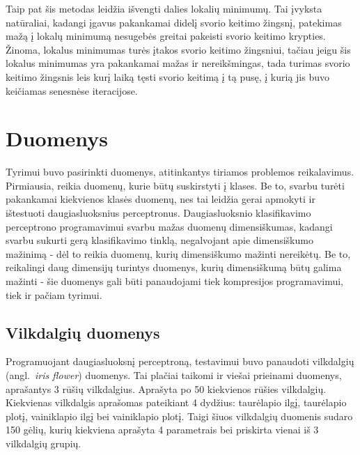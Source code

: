 \documentclass{VUMIFPSbakalaurinis}
\begin{document}
Taip pat šis metodas leidžia išvengti dalies lokalių minimumų.
Tai įvyksta natūraliai, kadangi įgavus pakankamai didelį svorio keitimo žingsnį, patekimas mažą į lokalų minimumą nesugebės greitai pakeisti svorio keitimo krypties.
Žinoma, lokalus minimumas turės įtakos svorio keitimo žingsniui, tačiau jeigu šis lokalus minimumas yra pakankamai mažas ir nereikšmingas, tada turimas svorio keitimo žingsnis leis kurį laiką tęsti svorio keitimą į tą pusę, į kurią jis buvo keičiamas senesnėse iteracijose.




\section{Duomenys}

Tyrimui buvo pasirinkti duomenys, atitinkantys tiriamos problemos reikalavimus.
Pirmiausia, reikia duomenų, kurie būtų suskirstyti į klases.
Be to, svarbu turėti pakankamai kiekvienos klasės duomenų, nes tai leidžia gerai apmokyti ir ištestuoti daugiasluoksnius perceptronus.
Daugiasluoksnio klasifikavimo perceptrono programavimui svarbu mažas duomenų dimensiškumas, kadangi svarbu sukurti gerą klasifikavimo tinklą, negalvojant apie dimensiškumo mažinimą - dėl to reikia duomenų, kurių dimensiškumo mažinti nereikėtų.
Be to, reikalingi daug dimensijų turintys duomenys, kurių dimensiškumą būtų galima mažinti - šie duomenys gali būti panaudojami tiek kompresijos programavimui, tiek ir pačiam tyrimui.



\subsection{Vilkdalgių duomenys}

Programuojant daugiasluoksnį perceptroną, testavimui buvo panaudoti vilkdalgių (angl.~\textit{iris flower}) duomenys.
Tai plačiai taikomi ir viešai prieinami duomenys, aprašantys 3 rūšių vilkdalgius.
Aprašyta po 50 kiekvienos rūšies vilkdalgių.
Kiekvienas vilkdalgis aprašomas pateikiant 4 dydžius: taurėlapio ilgį, taurėlapio plotį, vainiklapio ilgį bei vainiklapio plotį.
Taigi šiuos vilkdalgių duomenis sudaro 150 gėlių, kurių kiekviena aprašyta 4 parametrais bei priskirta vienai iš 3 vilkdalgių grupių.
\end{document}
